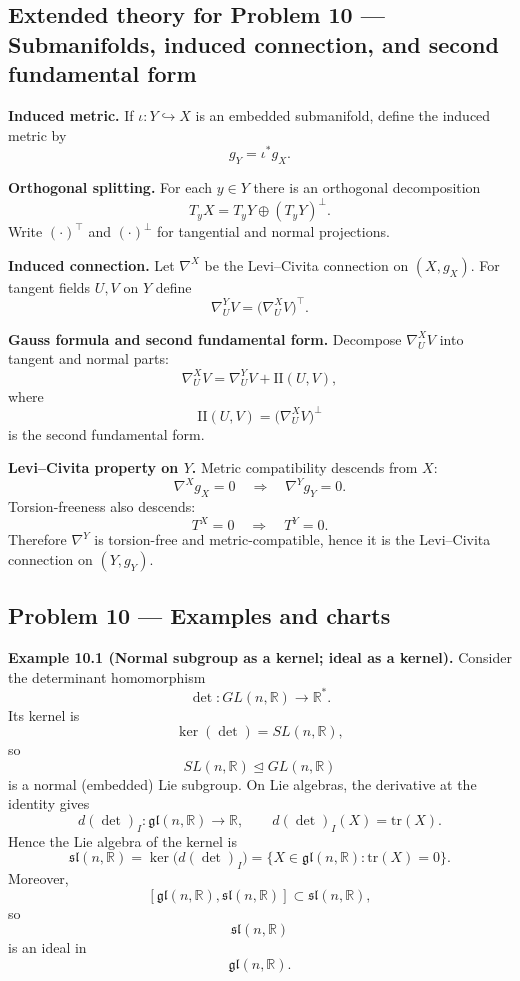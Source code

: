 \documentclass[12pt,a4paper]{article}
\theoremstyle{plain}
\theoremstyle{definition}      %
\begin{document}
\subsection*{Extended theory for Problem 10 — Submanifolds, induced connection, and second fundamental form}

\textbf{Induced metric.}
If $\iota:Y\hookrightarrow X$ is an embedded submanifold, define the induced metric by
\[
g_Y=\iota^*g_X.
\]

\textbf{Orthogonal splitting.}
For each $y\in Y$ there is an orthogonal decomposition
\[
T_yX=T_yY\oplus (T_yY)^\perp.
\]
Write $(\cdot)^\top$ and $(\cdot)^\perp$ for tangential and normal projections.

\textbf{Induced connection.}
Let $\nabla^X$ be the Levi--Civita connection on $(X,g_X)$.
For tangent fields $U,V$ on $Y$ define
\[
\nabla^Y_U V=\bigl(\nabla^X_U V\bigr)^\top.
\]

\textbf{Gauss formula and second fundamental form.}
Decompose $\nabla^X_U V$ into tangent and normal parts:
\[
\nabla^X_U V=\nabla^Y_U V+\mathrm{II}(U,V),
\]
where
\[
\mathrm{II}(U,V)=\bigl(\nabla^X_U V\bigr)^\perp
\]
is the second fundamental form.

\textbf{Levi--Civita property on $Y$.}
Metric compatibility descends from $X$:
\[
\nabla^X g_X=0
\quad\Longrightarrow\quad
\nabla^Y g_Y=0.
\]
Torsion-freeness also descends:
\[
T^X=0
\quad\Longrightarrow\quad
T^Y=0.
\]
Therefore $\nabla^Y$ is torsion-free and metric-compatible, hence it is the Levi--Civita connection on $(Y,g_Y)$.


\subsection*{Problem 10 — Examples and charts}

\textbf{Example 10.1 (Normal subgroup as a kernel; ideal as a kernel).}
Consider the determinant homomorphism
\[
\det:GL(n,\mathbb{R})\to\mathbb{R}^{\ast}.
\]
Its kernel is
\[
\ker(\det)=SL(n,\mathbb{R}),
\]
so
\[
SL(n,\mathbb{R})\trianglelefteq GL(n,\mathbb{R})
\]
is a normal (embedded) Lie subgroup.
On Lie algebras, the derivative at the identity gives
\[
d(\det)_{I}:\mathfrak{gl}(n,\mathbb{R})\to\mathbb{R},
\qquad
d(\det)_{I}(X)=\mathrm{tr}(X).
\]
Hence the Lie algebra of the kernel is
\[
\mathfrak{sl}(n,\mathbb{R})
=
\ker\bigl(d(\det)_{I}\bigr)
=
\{X\in\mathfrak{gl}(n,\mathbb{R}):\mathrm{tr}(X)=0\}.
\]
Moreover,
\[
[\mathfrak{gl}(n,\mathbb{R}),\mathfrak{sl}(n,\mathbb{R})]\subset\mathfrak{sl}(n,\mathbb{R}),
\]
so
\[
\mathfrak{sl}(n,\mathbb{R})
\]
is an ideal in
\[
\mathfrak{gl}(n,\mathbb{R}).
\]
\end{document}

